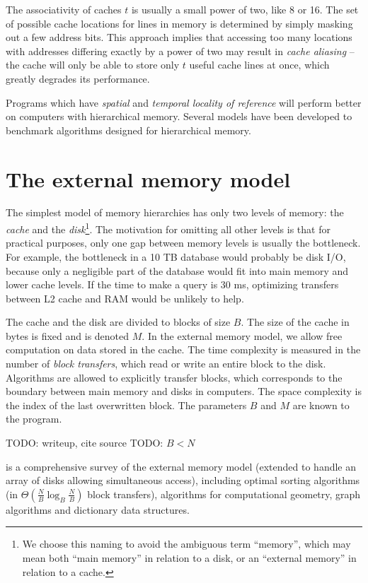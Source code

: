The associativity of caches $t$ is usually a small power of two, like 8 or 16.
The set of possible cache locations for lines in memory is determined
by simply masking out a few address bits. This approach implies that
accessing too many locations with addresses differing exactly by a power
of two may result in \emph{cache aliasing} -- the cache will only be able
to store only $t$ useful cache lines at once, which greatly degrades its
performance.

Programs which have \emph{spatial} and \emph{temporal locality of reference}
will perform better on computers with hierarchical memory. Several models have
been developed to benchmark algorithms designed for hierarchical memory.

\section{The external memory model}
The simplest model of memory hierarchies has only two levels of memory:
the \emph{cache} and the \emph{disk}\footnote{
	We choose this naming to avoid the ambiguous term ``memory'',
	which may mean both ``main memory'' in relation to a disk,
	or an ``external memory'' in relation to a cache.
}. The motivation for omitting all other levels is that for practical purposes,
only one gap between memory levels is usually the bottleneck. For example,
the bottleneck in a 10 TB database would probably be disk I/O, because
only a negligible part of the database would fit into main memory and
lower cache levels. If the time to make a query is 30 ms, optimizing transfers
between L2 cache and RAM would be unlikely to help.

The cache and the disk are divided to blocks of size $B$. The size of the cache 
in bytes is fixed and is denoted $M$.
In the external memory model, we allow free computation on data
stored in the cache. The time complexity is measured in the number of
\emph{block transfers}, which read or write an entire block to the disk.
Algorithms are allowed to explicitly transfer blocks, which corresponds
to the boundary between main memory and disks in computers.
The space complexity is the index of the last overwritten block.
The parameters $B$ and $M$ are known to the program.

TODO: writeup, cite source
TODO: $B<N$

\cite{em-ads} is a comprehensive survey of the external memory model
(extended to handle an array of disks allowing simultaneous access), including
optimal sorting algorithms (in $\Theta(\frac{N}{B}\log_{B}\frac{N}{B})$
block transfers), algorithms for computational geometry, graph algorithms
and dictionary data structures.

